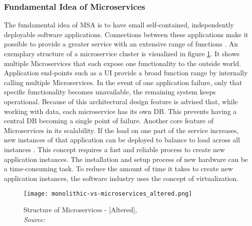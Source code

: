 \documentclass[12pt, a4paper]{article}
\begin{document}
        \subsubsection{Fundamental Idea of Microservices}\label{sssec::micro}
        The fundamental idea of \ac{MSA} is to have small self-contained, independently deployable software applications. Connections between these applications make it possible to provide a greater service with an extensive range of functions \cite{micro}. An exemplary structure of a microservice cluster is visualized in figure \ref{fig::micro}. It shows multiple Microservices that each expose one functionality to the outside world. Application end-points such as a \ac{UI} provide a broad function range by internally calling multiple Microservices. In the event of one application failure, only that specific functionality becomes unavailable, the remaining system keeps operational. Because of this architectural design feature is advised that, while working with data, each microservice has its own \ac{DB}. This prevents having a central \acl{DB} becoming a single point of failure. Another core feature of Microservices in its scalability. If the load on one part of the service increases, new instances of that application can be deployed to balance to load across all instances \cite{micro}. This concept requires a fast and reliable process to create new application instances.\newline
        The installation and setup process of new hardware can be a time-consuming task. To reduce the amount of time it takes to create new application instances, the software industry uses the concept of virtualization.

        \begin{figure}
            \centering
            \texttt{[image: monolithic-vs-microservices\_altered.png]}
            \caption{Structure of Microservices - [Altered], \\\textit{Source:~\cite{redhat_micro}}}\label{fig::micro}
        \end{figure}
\end{document}
